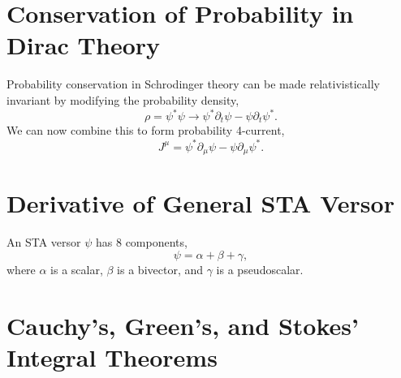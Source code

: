 \section{Conservation of Probability in Dirac Theory}
Probability conservation in Schrodinger theory can be made relativistically invariant by modifying the probability density,
\[
\rho = \psi^*\psi \rightarrow \psi^*\partial_t\psi - \psi \partial_t\psi^*. 
\]
We can now combine this to form probability 4-current,
\[
J^\mu = \psi^*\partial_\mu\psi - \psi \partial_\mu\psi^*.
\]
\section{Derivative of General STA Versor}
An STA versor $\psi$ has 8 components,
\[
\psi = \alpha + \beta + \gamma,
\]
where $\alpha$ is a scalar, $\beta$ is a bivector, and $\gamma$ is a pseudoscalar.
\section{Cauchy's, Green's, and Stokes' Integral Theorems}
